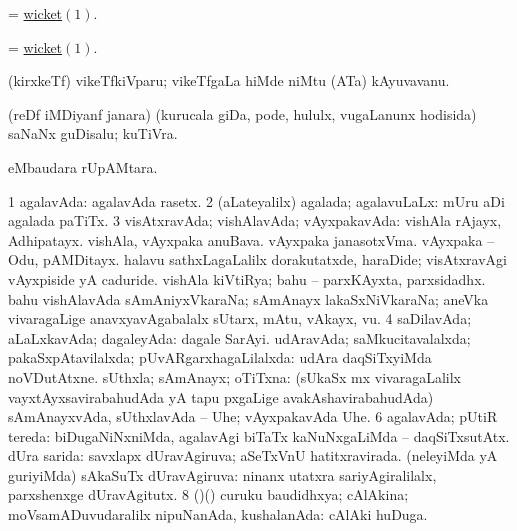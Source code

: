 \bentry 
{}
\gl{\nA}
\bmng
= \hyperlink{wicket}{wicket\((1)\)}. 
\emng
\eentry

\bentry
{}
\gl{\nA}
\bmng
= \hyperlink{wicket}{wicket\((1)\)}. 
\emng
\eentry

\bentry
{}
\gl{\nA}
\bmng
(kirxkeTf) vikeTfkiVparu; vikeTfgaLa hiMde niMtu (ATa) kAyuvavanu. 
\emng
\eentry

\bentry
{}
\gl{\nA}
\bmng
(reDf iMDiyanf janara) (kurucala giDa, pode, hululx, \mo vugaLanunx hodisida) saNaNx guDisalu; kuTiVra.  
\emng
\eentry

\bentry
{}
\gl{\kirxvi}
\bmng
{} eMbaudara rUpAMtara. 
\emng
\eentry

\bentry
{} 
\gl{\gu}
\expl{}
\bmng
\bnum
\num{1} agalavAda:  agalavAda rasetx. 
\num{2} (aLateyalilx) agalada; agalavuLaLx:  mUru aDi agalada paTiTx. 
\num{3} visAtxravAda; vishAlavAda; vAyxpakavAda:  vishAla rAjayx, Adhipatayx.  vishAla, vAyxpaka anuBava.  vAyxpaka janasotxVma.  vAyxpaka -- Odu, pAMDitayx.  halavu sathxLagaLalilx dorakutatxde, haraDide; visAtxravAgi vAyxpiside yA caduride.  vishAla kiVtiRya; bahu -- parxKAyxta, parxsidadhx.  bahu vishAlavAda sAmAniyxVkaraNa; sAmAnayx lakaSxNiVkaraNa; aneVka vivaragaLige anavxyavAgabalalx sUtarx, mAtu, vAkayx, \mo vu. 
\num{4} saDilavAda; aLaLxkavAda; dagaleyAda:  dagale SarAyi. 
\banum
{} udAravAda; saMkucitavalalxda; pakaSxpAtavilalxda; pUvARgarxhagaLilalxda:  udAra daqSiTxyiMda noVDutAtxne. 
 sUthxla; sAmAnayx; oTiTxna:  (sUkaSx mx vivaragaLalilx vayxtAyxsavirabahudAda yA tapu pxgaLige avakAshavirabahudAda) sAmAnayxvAda, sUthxlavAda -- Uhe; vAyxpakavAda Uhe. 
\eanum
\numie
\num{6} agalavAda; pUtiR tereda:  biDugaNiNxniMda, agalavAgi biTaTx kaNuNxgaLiMda -- daqSiTxsutAtx. 
 dUra sarida: 
\banum
{} savxlapx dUravAgiruva; aSeTxVnU hatitxravirada. 
 (neleyiMda yA guriyiMda) sAkaSuTx dUravAgiruva:  ninanx utatxra sariyAgiralilalx, parxshenxge dUravAgitutx. 
\eanum
\numie
\num{8} (\birx)(\ashi) curuku baudidhxya; cAlAkina; moVsamADuvudaralilx nipuNanAda, kushalanAda:  cAlAki huDuga. 
\enum
\emng

